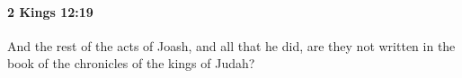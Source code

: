 
		\paragraph{2 Kings 12:19} %
			\label{2KINGS-12-19}

			And the rest of the acts of Joash, and all that he did, are they not written in the book of the chronicles of the kings of Judah?


